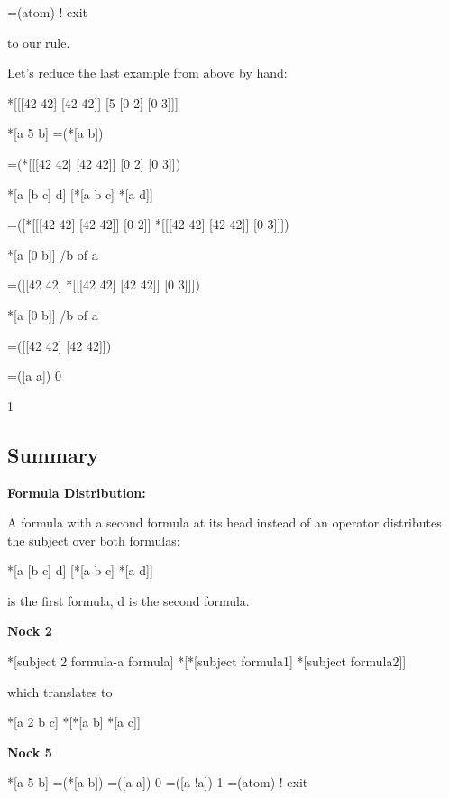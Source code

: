 \begin{code}
=(atom)              ! exit
\end{code}
to our rule.

Let's reduce the last example from above by hand:

\begin{code}
*[[[42 42] [42 42]] [5 [0 2] [0 3]]]

    *[a 5 b]                =(*[a b])

=(*[[[42 42] [42 42]] [0 2] [0 3]])

    *[a [b c] d]            [*[a b c] *[a d]]

=([*[[[42 42] [42 42]] [0 2]] *[[[42 42] [42 42]] [0 3]]])

    *[a [0 b]]               /b of a

=([[42 42] *[[[42 42] [42 42]] [0 3]]])

    *[a [0 b]]               /b of a

=([[42 42] [42 42]])

    =([a a])                 0

1
\end{code}

\subsection{Summary}

\textbf{Formula Distribution:}

A formula with a second formula at its head instead of an operator distributes the subject over both formulas:
\begin{code}
*[a [b c] d]          [*[a b c] *[a d]]
\end{code}
\kode{[b c]} is the first formula, d is the second formula.

\textbf{Nock 2}

\begin{code}
*[subject 2 formula-a formula]               *[*[subject formula1] *[subject formula2]]
\end{code}
which translates to

\begin{code}
*[a 2 b c]            *[*[a b] *[a c]]
\end{code}
\textbf{Nock 5}
\begin{code}
*[a 5 b]              =(*[a b])
=([a a])              0
=([a !a])              1
=(atom)               ! exit
\end{code}

